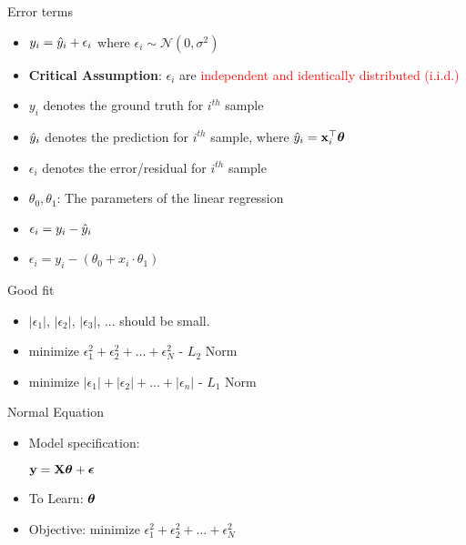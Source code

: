 \documentclass{beamer}
\begin{document}
\begin{frame}{Error terms}


	\begin{itemize}[<+->]
		\item $y_{i} = \hat{y}_i + \epsilon_{i}$ where $\epsilon_{i} \sim \mathcal{N}(0, \sigma^2)$
		\item \textbf{Critical Assumption}: $\epsilon_{i}$ are \textcolor{red}{independent and identically distributed (i.i.d.)}
		\item $y_{i}$ denotes the ground truth for $i^{th}$ sample
		\item $\hat{y}_i$ denotes the prediction for $i^{th}$ sample, where $\hat{y}_i = \mathbf{x}_{i}^\top \boldsymbol{\theta}$
		\item $\epsilon_{i}$ denotes the error/residual for $i^{th}$ sample
		\item $\theta_{0}, \theta_{1}$: The parameters of the linear regression
		\item   $  \epsilon_{i} = y_{i} - \hat{y}_i$
		\item     $\epsilon_{i} = y_{i} - (\theta_{0} + x_{i} \cdot \theta_{1})$

\end{itemize}





\end{frame}



\begin{frame}{Good fit}

\begin{itemize}
    \item<+-> $|\epsilon_{1}|$, $|\epsilon_{2}|$, $|\epsilon_{3}|$, ... should be small.
    \item<+-> 
${\text{minimize }} \epsilon_{1}^2 + \epsilon_{2}^2 + \dots + \epsilon_{N}^2$ - $L_{2}$ Norm
    \item<+-> 
${\text{minimize }} |\epsilon_{1}| + |\epsilon_{2}| + \dots + |\epsilon_{n}|$ - $L_{1}$ Norm
\end{itemize}
\end{frame}





\begin{frame}{Normal Equation}
\begin{itemize}[<+->]
    \item Model specification:
        \begin{center}
        \begin{tcolorbox}
            $ \mathbf{y} = \mathbf{X}\boldsymbol{\theta} + \boldsymbol{\epsilon}$
        \end{tcolorbox}
        \end{center}
    \item To Learn: $\boldsymbol{\theta}$
    \item Objective: ${\text{minimize }} \epsilon_{1}^2 + \epsilon_{2}^2 + \dots + \epsilon_{N}^2$
\end{itemize}
\end{frame}
\end{document}
